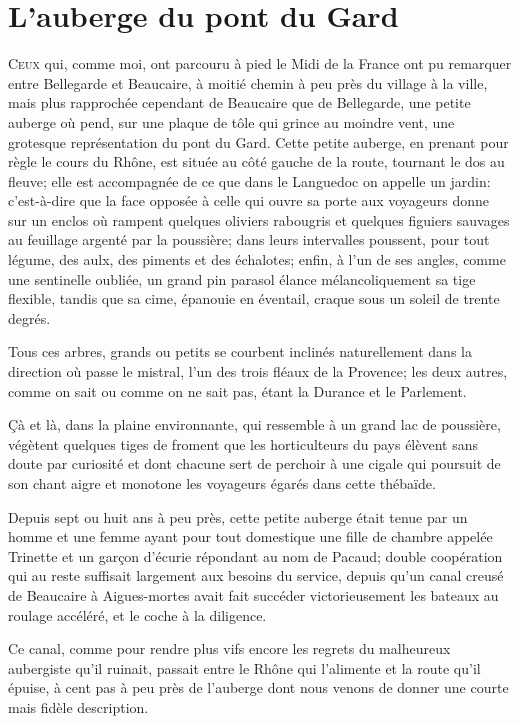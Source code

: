 \chapter{L'auberge du pont du Gard}

\lettrine{C}{eux} qui, comme moi, ont parcouru à pied le Midi de la France ont pu remarquer entre Bellegarde et Beaucaire, à moitié chemin à peu près du village à la ville, mais plus rapprochée cependant de Beaucaire que de Bellegarde, une petite auberge où pend, sur une plaque de tôle qui grince au moindre vent, une grotesque représentation du pont du Gard. Cette petite auberge, en prenant pour règle le cours du Rhône, est située au côté gauche de la route, tournant le dos au fleuve; elle est accompagnée de ce que dans le Languedoc on appelle un jardin: c'est-à-dire que la face opposée à celle qui ouvre sa porte aux voyageurs donne sur un enclos où rampent quelques oliviers rabougris et quelques figuiers sauvages au feuillage argenté par la poussière; dans leurs intervalles poussent, pour tout légume, des aulx, des piments et des échalotes; enfin, à l'un de ses angles, comme une sentinelle oubliée, un grand pin parasol élance mélancoliquement sa tige flexible, tandis que sa cime, épanouie en éventail, craque sous un soleil de trente degrés.

Tous ces arbres, grands ou petits se courbent inclinés naturellement dans la direction où passe le mistral, l'un des trois fléaux de la Provence; les deux autres, comme on sait ou comme on ne sait pas, étant la Durance et le Parlement.

Çà et là, dans la plaine environnante, qui ressemble à un grand lac de poussière, végètent quelques tiges de froment que les horticulteurs du pays élèvent sans doute par curiosité et dont chacune sert de perchoir à une cigale qui poursuit de son chant aigre et monotone les voyageurs égarés dans cette thébaïde.

Depuis sept ou huit ans à peu près, cette petite auberge était tenue par un homme et une femme ayant pour tout domestique une fille de chambre appelée Trinette et un garçon d'écurie répondant au nom de Pacaud; double coopération qui au reste suffisait largement aux besoins du service, depuis qu'un canal creusé de Beaucaire à Aigues-mortes avait fait succéder victorieusement les bateaux au roulage accéléré, et le coche à la diligence.

Ce canal, comme pour rendre plus vifs encore les regrets du malheureux aubergiste qu'il ruinait, passait entre le Rhône qui l'alimente et la route qu'il épuise, à cent pas à peu près de l'auberge dont nous venons de donner une courte mais fidèle description.

